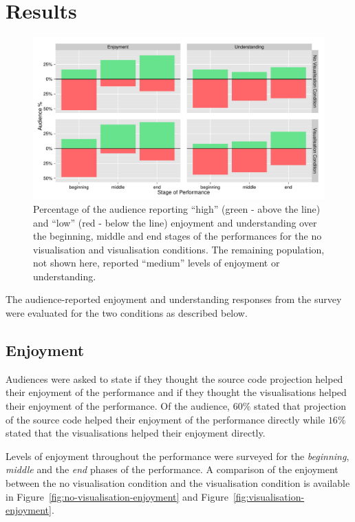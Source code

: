 \section{Results}

\begin{figure}
  \centering
  \includegraphics[width=\columnwidth]{../study-3/results/dimension-condition-study-3.pdf}
  \caption[Follow-up user study survey condition and dimension results]{Percentage of the audience reporting ``high'' (green - above the line) and ``low'' (red - below the line) enjoyment and understanding over the beginning, middle and end stages of the performances for the no visualisation and visualisation conditions. The remaining population, not shown here, reported ``medium'' levels of enjoyment or understanding.}
  \label{fig:dimension-condition-follow-up-user-study}
\end{figure}

The audience-reported enjoyment and understanding responses from the survey were evaluated for the two conditions as described below.

\subsection{Enjoyment}



Audiences were asked to state if they thought the source code projection helped their enjoyment of the performance and if they thought the visualisations helped their enjoyment of the performance. Of the audience, $60\%$ stated that projection of the source code helped their enjoyment of the performance directly while $16\%$ stated that the visualisations helped their enjoyment directly.

Levels of enjoyment throughout the performance were surveyed for the \emph{beginning}, \emph{middle} and the \emph{end} phases of the performance. A comparison of the enjoyment between the no visualisation condition and the visualisation condition is available in Figure~\ref{fig:no-visualisation-enjoyment} and Figure~\ref{fig:visualisation-enjoyment}.

